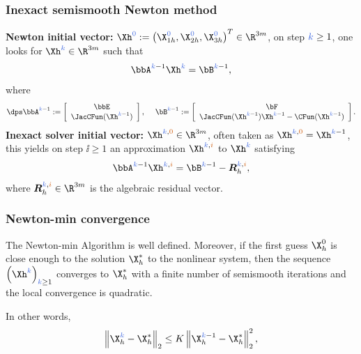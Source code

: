 \begin{frame}
\frametitle{Inexact semismooth Newton method}
\textcolor{cadmiumgreen}{\textbf{Newton initial vector:}} $\Xh^{\zzero} \egaldef \left(\X_{1h}^{\zzero},\X_{2h}^{\zzero}, \X_{3h}^{\zzero} \right)^{T} \in \R^{3 m}$, on step $\kk \geq 1$, one looks for $\Xh^{\kk} \in \R^{3 m}$ such that
\begin{equation*}
\bbA^{\kk-1}\Xh^{\kk}=\bB^{\kk-1},
\end{equation*} 
where 
\begin{equation*}
\dps \bbA^{\kk-1}\egaldef
\left[\begin{array}{c}
\bbE \\
\JacCFun(\Xh^{\kk-1})
\end{array}
\right],
\quad  \hspace{0.1 cm} \bB^{\kk-1} \egaldef
\left[\begin{array}{c}
\bF\\
\JacCFun(\Xh^{\kk-1})\Xh^{\kk-1}-\CFun(\Xh^{\kk-1})
\end{array}
\right].
\end{equation*}
\textcolor{cadmiumgreen}{\textbf{Inexact solver initial vector:}}
$\Xh^{\kk,\izzero} \in \R^{3 m}$, often taken as $\Xh^{\kk,\izzero} = \Xh^{\kk-1}$, this yields on step $\ii \geq 1$
an approximation $\Xh^{\kk,\ii}$ to $\Xh^{\kk}$ satisfying
\begin{equation*}
\bbA^{\kk-1}\Xh^{\kk,\ii} =\bB^{\kk-1}-{\bm R}_h^{\kk,\ii},
\end{equation*}
where ${\bm R}_h^{\kk,\ii} \in \R^{3 m}$ is the algebraic residual vector.
\end{frame}
\begin{frame}
  \frametitle{Newton-min convergence}
  \begin{theorem}
    The Newton-min Algorithm is well defined.
    Moreover, if the first guess $\X_h^0$  is close enough to the solution $\X_h^*$ to the nonlinear system, then the sequence $\left(\Xh^{\kk}\right)_{\kk \geq 1}$ converges to $\X_h^*$ with a finite number of semismooth iterations and the local convergence is quadratic.

    In other words,
    \begin{equation*}
\begin{split}
  \left\| \X_h^{\kk} - \X_h^* \right\|_2 \leq K \left\| \X_h^{\kk-1} - \X_h^* \right\|_2^2,
\end{split}
\end{equation*}
  \end{theorem}

  \end{frame}
